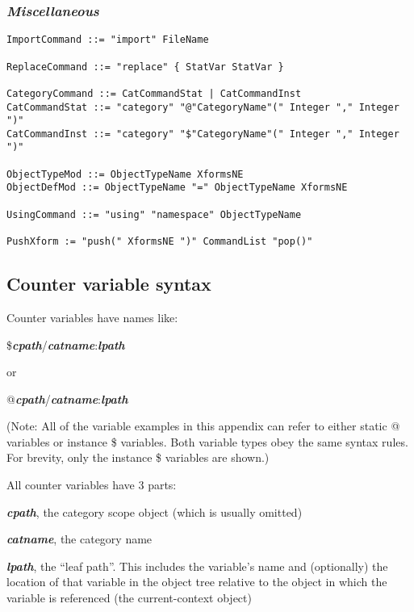 \documentclass[11pt]{article}
\begin{document}
\subsubsection*{\textit{Miscellaneous}}

\begin{verbatim}
ImportCommand ::= "import" FileName

ReplaceCommand ::= "replace" { StatVar StatVar }

CategoryCommand ::= CatCommandStat | CatCommandInst
CatCommandStat ::= "category" "@"CategoryName"(" Integer "," Integer ")"
CatCommandInst ::= "category" "$"CategoryName"(" Integer "," Integer ")"

ObjectTypeMod ::= ObjectTypeName XformsNE
ObjectDefMod ::= ObjectTypeName "=" ObjectTypeName XformsNE

UsingCommand ::= "using" "namespace" ObjectTypeName

PushXform := "push(" XformsNE ")" CommandList "pop()"
\end{verbatim}



\subsection{Counter variable syntax}
\label{sec:adv_variable_syntax}

Counter variables have names like:

\$\textit{\textbf{cpath}}/\textit{\textbf{catname}}:\textit{\textbf{lpath}}

or

@\textit{\textbf{cpath}}/\textit{\textbf{catname}}:\textit{\textbf{lpath}}

(Note: All of the variable examples in this appendix can refer to either 
static @ variables or instance \$ variables.  Both variable types obey the
same syntax rules.  For brevity, only the instance \$ variables are shown.)

All counter variables have 3 parts: 

\begin{list}{}
\item
\textit{\textbf{cpath}}, the category scope object (which is usually omitted)
\item
\textit{\textbf{catname}}, the category name
\item
\textit{\textbf{lpath}}, the ``leaf path''. 
               This includes the variable's name and (optionally) 
               the location of that variable in the object tree relative 
               to the object in which the variable is referenced
               (the current-context object)
\item
\end{list}
\end{document}
